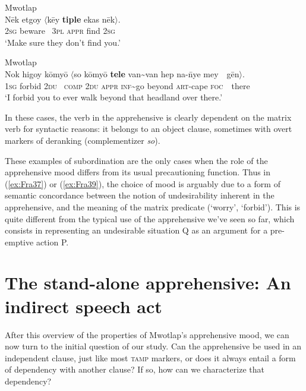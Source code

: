 \documentclass[output=paper,colorlinks,citecolor=brown]{langscibook}
\begin{document}
\ea \label{ex:Fra38} \textnormal{Mwotlap}  \\
\gll Nēk etgoy ${\langle}$kēy \textbf{tiple} ekas nēk${\rangle}$. \\
\textsc{2sg} beware ~\textsc{3pl} \textsc{appr} find \textsc{2sg} \\
\glt `Make sure they don't find you.' 
\z

\ea \label{ex:Fra39} \textnormal{Mwotlap}  \\
\gll Nok higoy kōmyō ${\langle}$so kōmyō \textbf{tele} van\textasciitilde van hep na-\={n}ye mey~~gēn${\rangle}$. \\
\textsc{1sg} forbid \textsc{2du} ~\textsc{comp} \textsc{2du} \textsc{appr} \textsc{inf}\textasciitilde go beyond \textsc{art}-cape \textsc{foc}~~there \\
\glt `I forbid you to ever walk beyond that headland over there.' 
\z

\noindent In these cases, the verb in the apprehensive is clearly dependent on the matrix verb for syntactic reasons: it belongs to an object clause, sometimes with overt markers of deranking (complementizer \textit{so}). 

These examples of subordination are the only cases when the role of the apprehensive mood differs from its usual precautioning function. Thus in (\ref{ex:Fra37}) or (\ref{ex:Fra39}), the choice of mood is arguably due to a form of semantic concordance between the notion of undesirability inherent in the apprehensive, and the meaning of the matrix predicate (`worry', `forbid'). This is quite different from the typical use of the apprehensive we've seen so far, which consists in representing an undesirable situation Q as an argument for a pre-emptive action P.

 





\section{The stand-alone apprehensive: An indirect speech act}
\label{sec:standalone}

After this overview of the properties of Mwotlap's apprehensive mood, we can now turn to the initial question of our study. Can the apprehensive be used in an independent clause, just like most \textsc{tamp} markers, or does it always entail a form of dependency with another clause? If so, how can we characterize that dependency?
 
\end{document}
